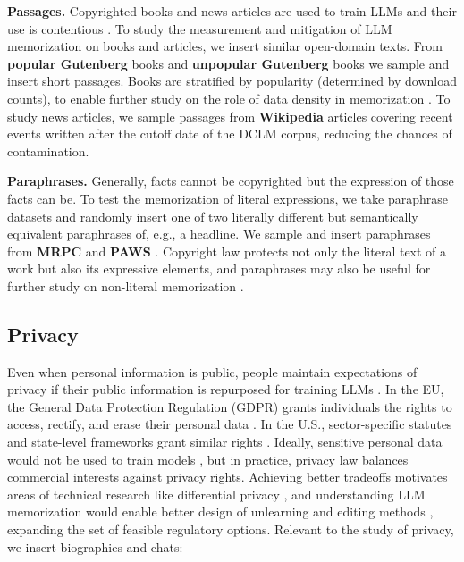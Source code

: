 \documentclass{article} %
\begin{document}
\textbf{Passages.} Copyrighted books and news articles are used to train LLMs and their use is contentious \citep{chang-etal-2023-speak,cooper2025extracting}. To study the measurement \citep[e.g.][]{ schwarzchild_rethinking_2024, hayes-etal-2025-measuring} and mitigation \citep[e.g.][]{ippolito-etal-2023-preventing, wei_evaluating_2024} of LLM memorization on books and articles, we insert similar open-domain texts. From \textbf{popular Gutenberg} books and \textbf{unpopular Gutenberg} books \citep{gerlach2018standardizedprojectgutenbergcorpus} we sample and insert short passages. Books are stratified by popularity (determined by download counts), to enable further study on the role of data density in memorization \citep{wang2025generalization, kirchenbauer2024lmd}. To study news articles, we sample passages from \textbf{Wikipedia} articles covering recent events written after the cutoff date of the \textsc{DCLM} corpus, reducing the chances of contamination.

\textbf{Paraphrases.} Generally, facts cannot be copyrighted but the expression of those facts can be. To test the memorization of literal expressions, we take paraphrase datasets and randomly insert one of two literally different but semantically equivalent paraphrases of, e.g., a headline. We sample and insert paraphrases from \textbf{MRPC} and \textbf{PAWS} \citep{dolan2005automatically, zhang-etal-2019-paws}. Copyright law protects not only the literal text of a work but also its expressive elements, and paraphrases may also be useful for further study on non-literal memorization \citep{chen-etal-2024-copybench,roh2025bobsconfettiphoneticmemorization}. 

\subsection{Privacy}

Even when personal information is public, people maintain expectations of privacy if their public information is repurposed for training LLMs \citep{DBLP:conf/fat/BrownLMST22}. In the EU, the General Data Protection Regulation (GDPR) grants individuals the rights to access, rectify, and erase their personal data \citep{gdpr2016}. In the U.S., sector-specific statutes and state-level frameworks grant similar rights \citep[e.g., the California Consumer Privacy Act,][]{ccpa2018}. 
Ideally, sensitive personal data would not be used to train models \citep{hong2025commonpoolprivacyproblems}, but in practice, privacy law balances commercial interests against privacy rights. Achieving better tradeoffs motivates areas of technical research like differential privacy \citep{NIST800226}, and understanding LLM memorization would enable better design of unlearning and editing methods \citep{bourtoule_2021_machine, meng2022locating}, expanding the set of feasible regulatory options. Relevant to the study of privacy, we insert biographies and chats:
\end{document}
